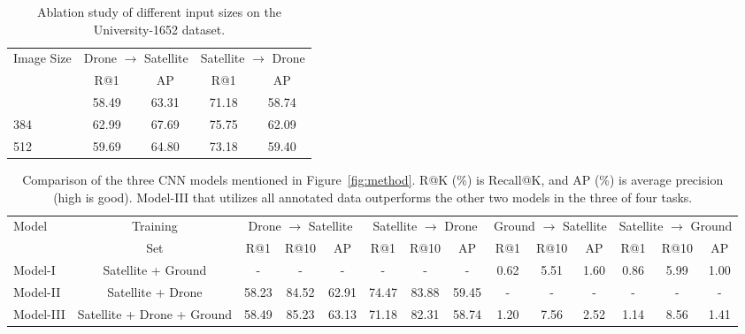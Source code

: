 \documentclass[sigconf]{acmart}
\begin{document}
\setlength{\tabcolsep}{11pt}
\begin{table}
\small
\begin{center}
\begin{tabular}{l|cc|cc}
\hline
\multirow{2}{*}{Image Size}& \multicolumn{2}{c|}{Drone $\rightarrow$ Satellite} & \multicolumn{2}{c}{Satellite $\rightarrow$ Drone}\\
  & R@1 & AP & R@1 & AP\\
\shline
256 & 58.49 & 63.31 & 71.18 & 58.74 \\
384 & 62.99 & 67.69 & 75.75 & 62.09 \\
512 & 59.69 & 64.80 & 73.18 & 59.40 \\
\hline
\end{tabular}
\end{center}
\caption{Ablation study of different input sizes on the University-1652 dataset. 
}
\label{table:Size}
\end{table}

\setlength{\tabcolsep}{5pt}
\begin{table*}
\small
\begin{center}
\begin{tabular}{l|c|ccc|ccc|ccc|ccc}
\hline
\multirow{2}{*}{Model} & Training & \multicolumn{3}{c|}{Drone $\rightarrow$ Satellite} & \multicolumn{3}{c|}{Satellite $\rightarrow$ Drone} & \multicolumn{3}{c|}{Ground $\rightarrow$ Satellite} & 
\multicolumn{3}{c}{Satellite $\rightarrow$ Ground}\\
  & Set & R@1 & R@10 & AP & R@1 & R@10 & AP & R@1 & R@10 & AP & R@1 & R@10 & AP \\
\shline
Model-I & Satellite + Ground & - & - & - & - & - & - & 0.62 & 5.51 & 1.60 & 0.86 & 5.99 & 1.00 \\
Model-II & Satellite + Drone & 58.23 & 84.52 & 62.91 & 74.47 & 83.88 & 59.45 & - & - & - & - & - & -\\
Model-III & Satellite + Drone + Ground & 58.49 & 85.23 &  63.13 & 71.18 & 82.31 & 58.74 & 1.20 & 7.56 & 2.52 & 1.14 & 8.56 & 1.41 \\
\hline
\end{tabular}
\end{center}
\caption{Comparison of the three CNN models mentioned in Figure~\ref{fig:method}. R@K (\%) is Recall@K, and AP (\%) is average precision (high is good). Model-III that utilizes all annotated data outperforms the other two models in the three of four tasks.
}
\vspace{-.2in}
\label{table:Baseline}
\end{table*}
\end{document}
